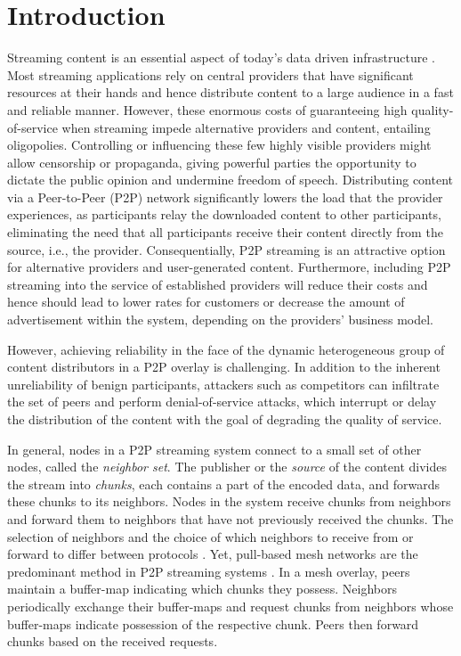 \section{Introduction}
\label{sec:intro}

Streaming content is an essential aspect of today's data driven infrastructure \cite{emule}.
Most streaming applications rely on central providers that have significant resources at their hands and hence distribute content to a large audience in a fast and reliable manner. 
However, these enormous costs of guaranteeing high quality-of-service when streaming impede alternative providers and content, entailing oligopolies.
Controlling or influencing these few highly visible providers might allow censorship or propaganda, giving powerful parties the opportunity  to dictate the public opinion and undermine freedom of speech.
Distributing content via a Peer-to-Peer (P2P) network significantly lowers the load that the provider experiences, as participants relay the downloaded content to other participants, eliminating the need that all participants receive their content directly from the source, i.e., the provider. 
Consequentially, P2P streaming is an attractive option for alternative providers and user-generated content.
Furthermore, including P2P streaming into the service of established providers will reduce their costs and hence should lead to lower rates for customers or decrease the amount of advertisement within the system, depending on the providers' business model. 


However, achieving reliability in the face of the dynamic heterogeneous group of content distributors in a P2P overlay is challenging. In addition to the inherent unreliability of benign participants, attackers such as competitors can infiltrate the set of peers and perform denial-of-service attacks, which interrupt or delay the distribution of the content with the goal of degrading the quality of service. 

In general, nodes in a P2P streaming system connect to a small set of other nodes, called the \emph{neighbor set}. 
The publisher or the \emph{source} of the content divides the stream into \emph{chunks}, each contains a part of the encoded data, and forwards these chunks to its neighbors. Nodes in the system receive chunks from neighbors and forward them to neighbors that have not previously received the chunks. 
The selection of neighbors and the choice of which neighbors to receive from or forward to differ between protocols \cite{sasi2014survey}.  Yet, pull-based mesh networks are the predominant method in P2P streaming systems \cite{zhang2014modeling}. In a mesh overlay, peers maintain a buffer-map indicating which chunks they possess.  Neighbors periodically exchange their buffer-maps and request chunks from neighbors whose buffer-maps indicate possession of the respective chunk. Peers then forward chunks based on the received requests. 


